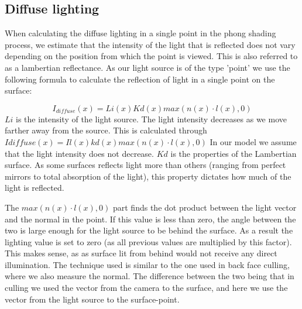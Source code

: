 \subsection{Diffuse lighting}
When calculating the diffuse lighting in a single point in the phong shading
process, we estimate that the intensity of the light that is reflected does not
vary depending on the position from which the point is viewed. This is also
referred to as a lambertian reflectance. As our light source is of the type
'point' we use the following formula to calculate the reflection of light in a
single point on the surface:

$$I_{diffuse}(x) = Li(x) Kd(x) max(n(x) · l(x), 0)$$ $Li$ is the intensity of
the light source. The light intensity decreases as we move farther away from
the source. This is calculated through $Idiffuse(x) = Il(x) kd(x) max(n(x) ·
l(x), 0)$ In our model we assume that the light intensity does not decrease.
$Kd$ is the properties of the Lambertian surface. As some surfaces reflects
light more than others (ranging from perfect mirrors to total absorption of the
light), this property dictates how much of the light is reflected.

The $max(n(x) · l(x), 0)$ part finds the dot product between the light vector
and the normal in the point. If this value is less than zero, the angle between
the two is large enough for the light source to be behind the surface. As a
result the lighting value is set to zero (as all previous values are multiplied
by this factor). This makes sense, as as surface lit from behind would not
receive any direct illumination. The technique used is similar to the one used
in back face culling, where we also measure the normal. The difference between
the two being that in culling we used the vector from the camera to the
surface, and here we use the vector from the light source to the surface-point. 



